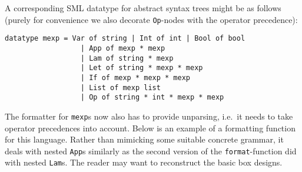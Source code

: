 A corresponding SML datatype for abstract syntax trees might be as follows
(purely for convenience we also decorate {\tt Op}-nodes with the operator
precedence):
 \begin{verbatim}
datatype mexp = Var of string | Int of int | Bool of bool
                  | App of mexp * mexp
                  | Lam of string * mexp
                  | Let of string * mexp * mexp
                  | If of mexp * mexp * mexp
                  | List of mexp list
                  | Op of string * int * mexp * mexp
 \end{verbatim}
The formatter for {\tt mexp}s now also has to provide unparsing, i.e.\ it needs
to take operator precedences into account.
Below is an example of a formatting function for this language.
Rather than mimicking some suitable concrete grammar,
it deals with nested {\tt App}s
similarly as the second version of the {\tt format}-function did with nested 
{\tt Lam}s.  The reader may want to reconstruct the basic box designs.

